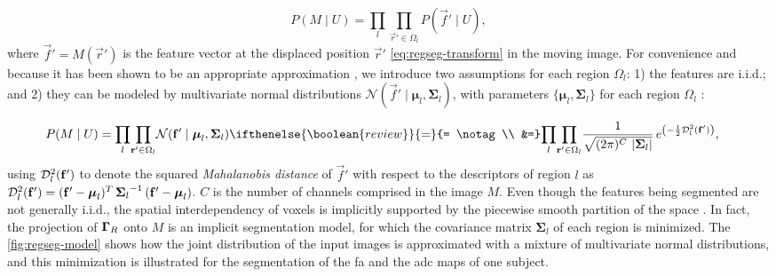   \begin{equation}
  P(M \mid U) = \underset{l}{\prod} \underset{\vec{r}'\in \Omega_l}{\prod}
    P\left( \vec{f}' \mid U \right),
  \label{eq:regseg-bayes_aposteriori}
  \end{equation}
  where $\vec{f}' = M(\vec{r}')$ is the feature vector at the displaced
  position $\vec{r}'$ \eqref{eq:regseg-transform} in the moving image.
For convenience and because it has been shown to be an appropriate approximation
  \citep{leemput_automated_1999,cuadra_comparison_2005}, we introduce two assumptions for each
  region $\Omega_l$:
  1) the features are i.i.d.; and 2) they can be modeled by multivariate normal
  distributions 
  $\mathcal{N} (\vec{f}' \mid \boldsymbol{\mu}_l, \boldsymbol{\Sigma}_{l} )$, with parameters
  $\lbrace \boldsymbol{\mu}_l, \boldsymbol{\Sigma}_{l} \rbrace$
  for each region $\Omega_l$ \citep{esteban_mbis_2014}:

  \begin{align}
  P( M \mid U) &= \underset{l}{\prod} \underset{\vec{r}' \in \Omega_l}{\prod}
  \mathcal{N} (\vec{f}' \mid \boldsymbol{\mu}_l, \boldsymbol{\Sigma}_{l} )
  \ifthenelse{\boolean{review}}{=}{= \notag\\ &=}
  \underset{l}{\prod} \underset{\vec{r}' \in \Omega_l}{\prod} \frac{1}{ \sqrt{(2\pi)^{C}\,\left|\boldsymbol{\Sigma}_{l}\right|}}\,{e^{\left(-\frac{1}{2}
  \mdist{f'}{l} \right)}},
  \label{eq:regseg-pdf}
  \end{align}%
  using $\mdist{f'}{l}$ to denote the squared \emph{Mahalanobis distance} of $\vec{f}'$ with respect
  to the descriptors of region $l$ as
  $\mdist{f'}{l} = (\vec{f}' - \boldsymbol{\mu}_l)^T \, {\boldsymbol{\Sigma}_l}^{-1} \, (\vec{f}' - \boldsymbol{\mu}_l)$.
$C$ is the number of channels comprised in the image $M$.
Even though the features being segmented are not generally i.i.d., the 
  spatial interdependency of voxels is implicitly supported by the piecewise smooth
  partition of the space \omegaset{}.
In fact, the projection of $\gammaset_R$ onto $M$ is an implicit segmentation model, for which
  the covariance matrix $\boldsymbol{\Sigma}_l$ of each region is minimized.
The \autoref{fig:regseg-model} shows how the joint distribution of 
  the input images is approximated with a mixture of multivariate normal distributions,
  and this minimization is illustrated for the segmentation of the \gls*{fa} and the \gls*{adc} maps
  of one subject.


